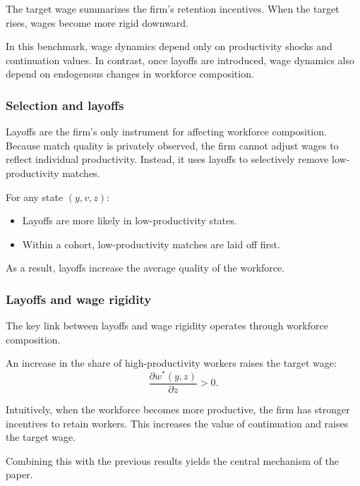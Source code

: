 The target wage summarizes the firm’s retention incentives. When the target rises, wages become more rigid downward.

In this benchmark, wage dynamics depend only on productivity shocks and continuation values. In contrast, once layoffs are introduced, wage dynamics also depend on endogenous changes in workforce composition.

\subsubsection*{Selection and layoffs}

Layoffs are the firm’s only instrument for affecting workforce composition. Because match quality is privately observed, the firm cannot adjust wages to reflect individual productivity. Instead, it uses layoffs to selectively remove low-productivity matches.

\begin{proposition}
For any state $(y,v,z)$:
\begin{itemize}
\item Layoffs are more likely in low-productivity states.
\item Within a cohort, low-productivity matches are laid off first.
\end{itemize}
\end{proposition}

As a result, layoffs increase the average quality of the workforce.

\subsubsection*{Layoffs and wage rigidity}

The key link between layoffs and wage rigidity operates through workforce composition.

\begin{proposition}
An increase in the share of high-productivity workers raises the target wage:
\[
\frac{\partial w^*(y,z)}{\partial z} > 0.
\]
\end{proposition}

Intuitively, when the workforce becomes more productive, the firm has stronger incentives to retain workers. This increases the value of continuation and raises the target wage.

Combining this with the previous results yields the central mechanism of the paper.

